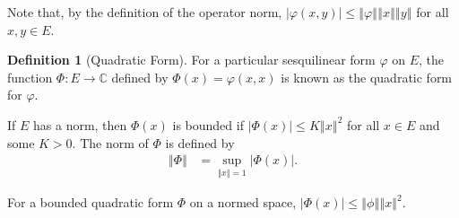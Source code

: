 \documentclass[12pt]{extarticle}
\newcommand{\C}{\mathbb{C}}
\newcommand{\norm}[1]{\left\Vert #1\right\Vert}
\theoremstyle{plain}
\theoremstyle{definition}
\newtheorem*{definition}{Definition}
\theoremstyle{remark}
\renewcommand{\newline}{\hfill\break}
\begin{document}
  Note that, by the definition of the operator norm, $\left\vert \varphi(x,y) \right\vert\leq \norm{\varphi}\norm{x}\norm{y}$ for all $x,y\in E$.
  \begin{definition}[Quadratic Form]
    For a particular sesquilinear form $\varphi$ on $E$, the function $\Phi: E\rightarrow \C$ defined by $\Phi(x) = \varphi(x,x)$ is known as the quadratic form for $\varphi$.\newline

    If $E$ has a norm, then $\Phi(x)$ is bounded if $\left\vert \Phi(x) \right\vert\leq K\norm{x}^2$ for all $x\in E$ and some $K > 0$. The norm of $\Phi$ is defined by
    \begin{align*}
      \norm{\Phi} &= \sup_{\norm{x} = 1}\left\vert \Phi(x) \right\vert.
    \end{align*}
  \end{definition}
  For a bounded quadratic form $\Phi$ on a normed space, $\left\vert \Phi(x) \right\vert\leq \norm{\phi}\norm{x}^2$.\newline
\end{document}
